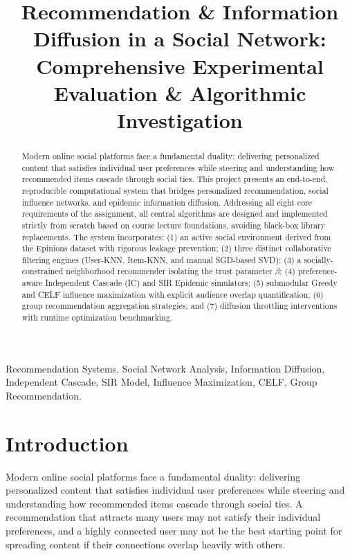 \documentclass[conference]{IEEEtran}
\begin{document}
\title{Recommendation \& Information Diffusion in a Social Network: Comprehensive Experimental Evaluation \& Algorithmic Investigation}

\author{
}

\maketitle

\begin{abstract}
Modern online social platforms face a fundamental duality: delivering personalized content that satisfies individual user preferences while steering and understanding how recommended items cascade through social ties. This project presents an end-to-end, reproducible computational system that bridges personalized recommendation, social influence networks, and epidemic information diffusion. Addressing all eight core requirements of the assignment, all central algorithms are designed and implemented strictly from scratch based on course lecture foundations, avoiding black-box library replacements. The system incorporates: (1) an active social environment derived from the Epinions dataset with rigorous leakage prevention; (2) three distinct collaborative filtering engines (User-KNN, Item-KNN, and manual SGD-based SVD); (3) a socially-constrained neighborhood recommender isolating the trust parameter $\beta$; (4) preference-aware Independent Cascade (IC) and SIR Epidemic simulators; (5) submodular Greedy and CELF influence maximization with explicit audience overlap quantification; (6) group recommendation aggregation strategies; and (7) diffusion throttling interventions with runtime optimization benchmarking.
\end{abstract}

\begin{IEEEkeywords}
Recommendation Systems, Social Network Analysis, Information Diffusion, Independent Cascade, SIR Model, Influence Maximization, CELF, Group Recommendation.
\end{IEEEkeywords}

\section{Introduction}
Modern online social platforms face a fundamental duality: delivering personalized content that satisfies individual user preferences while steering and understanding how recommended items cascade through social ties. A recommendation that attracts many users may not satisfy their individual preferences, and a highly connected user may not be the best starting point for spreading content if their connections overlap heavily with others. 
\end{document}
